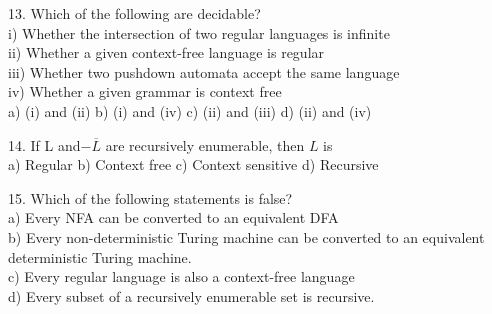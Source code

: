 \documentclass[8pt]{beamer}
\begin{document}
\begin{frame}
\hspace*{-0.4cm}
13. Which of the following are decidable?\\
\hspace*{0.5cm} i) Whether the intersection of two regular languages is infinite\\
\hspace*{0.5cm} ii) Whether a given context-free language is regular\\
\hspace*{0.5cm} iii) Whether two pushdown automata accept the same language\\
\hspace*{0.5cm} iv) Whether a given grammar is context free\\
\hspace*{0.5cm} a) (i) and (ii)   \hspace*{0.5cm}   b) (i) and (iv)   \hspace*{0.5cm}   c) (ii) and (iii)  \hspace*{0.5cm}   d) (ii) and (iv)\\
\vspace*{0.2cm}

\hspace*{-0.4cm}
14. If L and$-\overline{L}$ are recursively enumerable, then $L$ is\\
\hspace*{0.5cm} a) Regular    \hspace*{0.5cm}  b) Context free    \hspace*{0.5cm}  c) Context sensitive    \hspace*{0.5cm}  d) Recursive\\
\vspace*{0.2cm}

\hspace*{-0.4cm}
15. Which of the following statements is false?\\
\hspace*{0.5cm} a) Every NFA can be converted to an equivalent DFA\\
\hspace*{0.5cm} b) Every non-deterministic Turing machine can be converted to an equivalent deterministic
Turing machine.\\
\hspace*{0.5cm} c) Every regular language is also a context-free language\\
\hspace*{0.5cm} d) Every subset of a recursively enumerable set is recursive.\\
\vspace*{0.2cm}

\end{frame}
\end{document}
